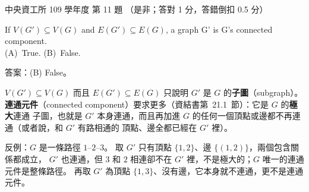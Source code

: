 \begin{pastexam}[label={px:ncu-109-dsa-11}]{中央資工所 109 學年度 第 11 題}
（是非；答對 1 分，答錯倒扣 0.5 分）

If $V(G')\subseteq V(G)$ and $E(G')\subseteq E(G)$, a graph G' is G's connected component.\\
(A)~True. \qquad (B)~False.
\end{pastexam}

\begin{pastsoln}
答案：(B) False。

$V(G') \subseteq V(G)$ 而且 $E(G') \subseteq E(G)$ 只說明 $G'$ 是 $G$ 的\textbf{子圖}（subgraph）。
\textbf{連通元件}（connected component）要求更多（資結書第~21.1~節）：它是 $G$ 的\textbf{極大}連通
子圖，也就是 $G'$ 本身連通，而且再加進 $G$ 的任何一個頂點或邊都不再連通（或者說，和 $G'$ 有路相通的
頂點、邊全都已經在 $G'$ 裡）。

反例：$G$ 是一條路徑 $1$--$2$--$3$。 取 $G'$ 只有頂點 $\{1, 2\}$、邊 $\{(1, 2)\}$，兩個包含關係都成立，
$G'$ 也連通，但 $3$ 和 $2$ 相連卻不在 $G'$ 裡，不是極大的；$G$ 唯一的連通元件是整條路徑。 再取 $G'$
為頂點 $\{1, 3\}$、沒有邊，它本身就不連通，更不是連通元件。
\end{pastsoln}
